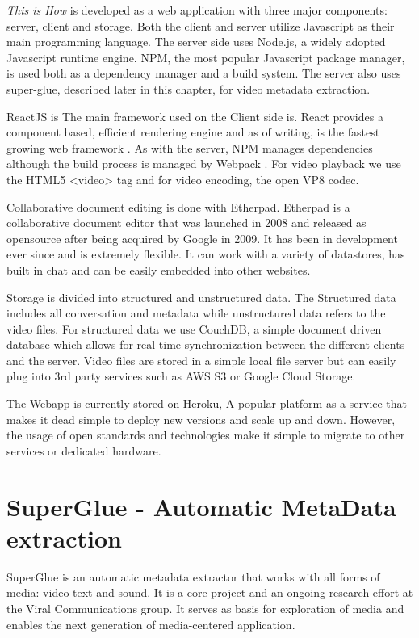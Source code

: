 \textit{This is How} is developed as a web application with three major components: server, client and storage. Both the client and server utilize Javascript as their main programming language. The server side uses Node.js, a widely adopted Javascript runtime engine. NPM\cite{}, the most popular Javascript package manager, is used both as a dependency manager and a build system. The server also uses super-glue, described later in this chapter, for video metadata extraction.

ReactJS is The main framework used on the Client side is. React provides a component based, efficient rendering engine and as of writing, is the fastest growing web framework \cite{reactjs}. As with the server, NPM manages dependencies although the build process is managed by Webpack \cite{webpack}. For video playback we use the HTML5 <video> tag and for video encoding, the open VP8\cite{} codec. 

Collaborative document editing is done with Etherpad\cite{ehterpad}. Etherpad is a collaborative document editor that was launched in 2008 and released as opensource after being acquired by Google in 2009. It has been in development ever since and is extremely flexible. It can work with a variety of datastores, has built in chat and can be easily embedded into other websites.

Storage is divided into structured and unstructured data. The Structured data includes all conversation and metadata while unstructured data refers to the video files. For structured data we use CouchDB\cite{couchdb}, a simple document driven database which allows for real time synchronization between the different clients and the server.  Video files are stored in a simple local file server but can easily plug into 3rd party services such as AWS S3 or Google Cloud Storage.

The Webapp is currently stored on Heroku, A popular platform-as-a-service that makes it dead simple to deploy new versions and scale up and down. However, the usage of open standards and technologies make it simple to migrate to other services or dedicated hardware. 

\section{SuperGlue - Automatic MetaData extraction}
SuperGlue is an automatic metadata extractor that works with all forms of media: video text and sound. It is a core project and an ongoing research effort at the Viral Communications group. It serves as basis for exploration of media and enables the next generation of media-centered application.

